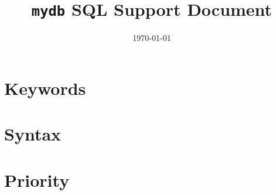 \documentclass[11pt, a4paper]{article}
\title{\textbf{\texttt{mydb} SQL Support Document}}
\date{\today}
\begin{document}
\maketitle

\section{Keywords}



\section{Syntax}



\section{Priority}


\end{document}
